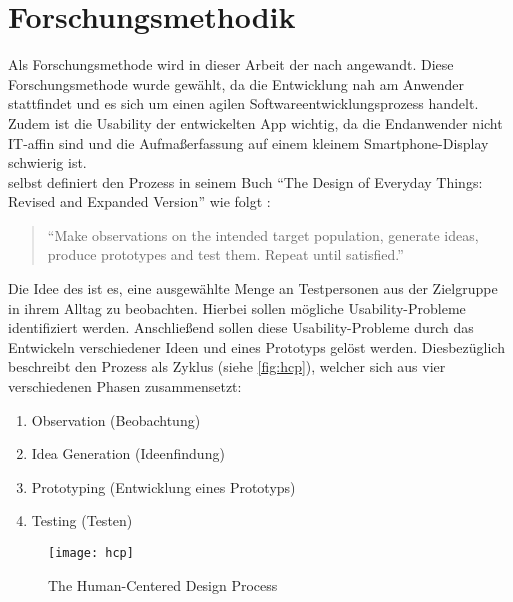 \chapter{Forschungsmethodik}
Als Forschungsmethode wird in dieser Arbeit der \hcdp{} nach \citeauthor{Norman13} angewandt.
Diese Forschungsmethode wurde gewählt, da die Entwicklung nah am Anwender stattfindet und es sich um einen agilen Softwareentwicklungsprozess handelt.
Zudem ist die Usability der entwickelten App wichtig, da die Endanwender nicht IT-affin sind und die Aufmaßerfassung auf einem kleinem Smartphone-Display schwierig ist. \\

\noindent
\citeauthor{Norman13} selbst definiert den Prozess in seinem Buch ``The Design of Everyday Things: Revised and Expanded Version'' wie folgt \citep[Abbildung 6.2]{Norman13}:

\begin{quote}
  ``Make observations on the intended target population, generate ideas, produce prototypes and test them.
  Repeat until satisfied.''
\end{quote}

\noindent
Die Idee des \hcdp{} ist es, eine ausgewählte Menge an Testpersonen aus der Zielgruppe in ihrem Alltag zu beobachten.
Hierbei sollen mögliche Usability-Probleme identifiziert werden.
Anschließend sollen diese Usability-Probleme durch das Entwickeln verschiedener Ideen und eines Prototyps gelöst werden.
Diesbezüglich beschreibt \citeauthor{Norman13} den Prozess als Zyklus (siehe \autoref{fig:hcp}), welcher sich aus vier verschiedenen Phasen zusammensetzt:

\begin{enumerate}
  \item Observation (Beobachtung) \label{itm:observation}
  \item Idea Generation (Ideenfindung) \label{itm:idea}
  \item Prototyping (Entwicklung eines Prototyps) \label{itm:prototyping}
  \item Testing (Testen) \label{itm:testing}
\end{enumerate}

\begin{figure}[h]
  \centering
  \texttt{[image: hcp]}
  \caption{The Human-Centered Design Process}
  \label{fig:hcp}
\end{figure}

